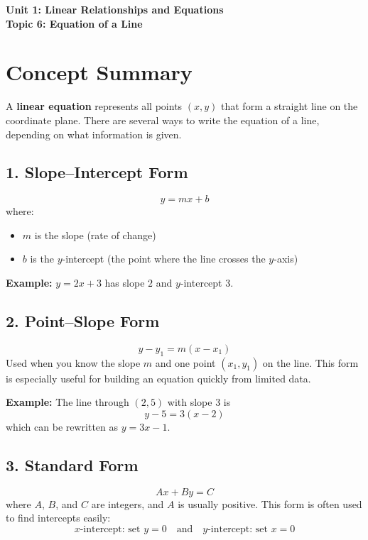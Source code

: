\documentclass[14pt]{extarticle}
\begin{document}
\raggedright
{}

\begin{center}
    \LARGE \textbf{Unit 1: Linear Relationships and Equations} \\[6pt]
    \Large \textbf{Topic 6: Equation of a Line}
\end{center}

\vspace{1em}

\section*{Concept Summary}

A \textbf{linear equation} represents all points \((x, y)\) that form a straight line on the coordinate plane.  
There are several ways to write the equation of a line, depending on what information is given.

\subsection*{1. Slope–Intercept Form}
\[
y = mx + b
\]
where:
\begin{itemize}
    \item \(m\) is the slope (rate of change)
    \item \(b\) is the \(y\)-intercept (the point where the line crosses the \(y\)-axis)
\end{itemize}

\textbf{Example:} \(y = 2x + 3\) has slope \(2\) and \(y\)-intercept \(3\).

\subsection*{2. Point–Slope Form}
\[
y - y_1 = m(x - x_1)
\]
Used when you know the slope \(m\) and one point \((x_1, y_1)\) on the line.  
This form is especially useful for building an equation quickly from limited data.

\textbf{Example:} The line through \((2, 5)\) with slope \(3\) is  
\[
y - 5 = 3(x - 2)
\]
which can be rewritten as \(y = 3x - 1\).

\subsection*{3. Standard Form}
\[
Ax + By = C
\]
where \(A\), \(B\), and \(C\) are integers, and \(A\) is usually positive.  
This form is often used to find intercepts easily:
\[
x\text{-intercept: set } y = 0 \quad \text{and} \quad y\text{-intercept: set } x = 0
\]
\end{document}
